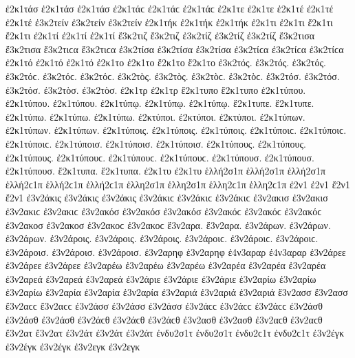 {ἐ2κ1τάσ ἐ2κ1τάσ ἐ2κ1τάσ ἐ2κ1τάϲ ἐ2κ1τάϲ ἐ2κ1τάϲ   %
ἐ2κ1τε ἐ2κ1τε 
ἐ2κ1τέ ἐ2κ1τέ ἐ2κ1τέ 
ἐ3κ2τείν ἐ3κ2τείν ἐ3κ2τείν   %
ἐ2κ1τήκ ἐ2κ1τήκ ἐ2κ1τήκ   %
ἐ2κ1τι ἐ2κ1τι 
ἔ2κ1τι ἔ2κ1τι 
ἐ2κ1τί ἐ2κ1τί ἐ2κ1τί 
ἔ3κ2τιζ ἔ3κ2τιζ   %
ἐ3κ2τίζ ἐ3κ2τίζ ἐ3κ2τίζ 
ἔ3κ2τισα ἔ3κ2τισα ἔ3κ2τιϲα ἔ3κ2τιϲα   %
ἐ3κ2τίσα ἐ3κ2τίσα ἐ3κ2τίσα ἐ3κ2τίϲα ἐ3κ2τίϲα ἐ3κ2τίϲα 
ἐ2κ1τό ἐ2κ1τό ἐ2κ1τό 
ἐ2κ1το ἐ2κ1το 
ἔ2κ1το ἔ2κ1το 
ἐ3κ2τός. ἐ3κ2τός. ἐ3κ2τός. ἐ3κ2τόϲ. ἐ3κ2τόϲ. ἐ3κ2τόϲ.   %
ἐ3κ2τὸς. ἐ3κ2τὸς. ἐ3κ2τὸϲ. ἐ3κ2τὸϲ. 
ἐ3κ2τόσ. ἐ3κ2τόσ. ἐ3κ2τόσ. 
ἐ3κ2τὸσ. ἐ3κ2τὸσ. 
ἐ2κ1τρ ἐ2κ1τρ 
ἔ2κ1τυπο ἔ2κ1τυπο   %
ἐ2κ1τύπου. ἐ2κ1τύπου. ἐ2κ1τύπου. 
ἐ2κ1τύπῳ. ἐ2κ1τύπῳ. ἐ2κ1τύπῳ. 
ἔ2κ1τυπε. ἔ2κ1τυπε. 
ἐ2κ1τύπω. ἐ2κ1τύπω. ἐ2κ1τύπω. 
ἐ2κτύποι. ἐ2κτύποι. ἐ2κτύποι. 
ἐ2κ1τύπων. ἐ2κ1τύπων. ἐ2κ1τύπων. 
ἐ2κ1τύποις. ἐ2κ1τύποις. ἐ2κ1τύποις. ἐ2κ1τύποιϲ. ἐ2κ1τύποιϲ. ἐ2κ1τύποιϲ. 
ἐ2κ1τύποισ. ἐ2κ1τύποισ. ἐ2κ1τύποισ. 
ἐ2κ1τύπους. ἐ2κ1τύπους. ἐ2κ1τύπους. ἐ2κ1τύπουϲ. ἐ2κ1τύπουϲ. ἐ2κ1τύπουϲ. 
ἐ2κ1τύπουσ. ἐ2κ1τύπουσ. ἐ2κ1τύπουσ. 
ἔ2κ1τυπα. ἔ2κ1τυπα. 
ἐ2κ1τυ ἐ2κ1τυ 
ἑλλή2σ1π ἑλλή2σ1π ἑλλή2σ1π ἑλλή2ϲ1π ἑλλή2ϲ1π ἑλλή2ϲ1π   %
ἑλλη2σ1π ἑλλη2σ1π ἑλλη2ϲ1π ἑλλη2ϲ1π 
ἐ2ν1 ἐ2ν1 
ἔ2ν1 ἔ2ν1 
ἐ3ν2άκις ἐ3ν2άκις ἐ3ν2άκις ἐ3ν2άκιϲ ἐ3ν2άκιϲ ἐ3ν2άκιϲ   %
ἐ3ν2ακισ ἐ3ν2ακισ ἐ3ν2ακιϲ ἐ3ν2ακιϲ   %
ἐ3ν2ακόσ ἐ3ν2ακόσ ἐ3ν2ακόσ ἐ3ν2ακόϲ ἐ3ν2ακόϲ ἐ3ν2ακόϲ   %
ἐ3ν2ακοσ ἐ3ν2ακοσ ἐ3ν2ακοϲ ἐ3ν2ακοϲ 
ἔ3ν2αρα. ἔ3ν2αρα.   %
ἐ3ν2άρων. ἐ3ν2άρων. ἐ3ν2άρων. 
ἐ3ν2άροις. ἐ3ν2άροις. ἐ3ν2άροις. ἐ3ν2άροιϲ. ἐ3ν2άροιϲ. ἐ3ν2άροιϲ. 
ἐ3ν2άροισ. ἐ3ν2άροισ. ἐ3ν2άροισ. 
ἐ3ν2αρηφ ἐ3ν2αρηφ   %
ἐ4ν3αραρ ἐ4ν3αραρ   %
ἐ3ν2άρεε ἐ3ν2άρεε ἐ3ν2άρεε   %
ἐ3ν2αρέω ἐ3ν2αρέω ἐ3ν2αρέω 
ἐ3ν2αρέα ἐ3ν2αρέα ἐ3ν2αρέα   %
ἐ3ν2αρεά ἐ3ν2αρεά ἐ3ν2αρεά 
ἐ3ν2άριε ἐ3ν2άριε ἐ3ν2άριε   %
ἐ3ν2αρίω ἐ3ν2αρίω ἐ3ν2αρίω 
ἐ3ν2αρία ἐ3ν2αρία ἐ3ν2αρία   %
ἐ3ν2αριά ἐ3ν2αριά ἐ3ν2αριά 
ἔ3ν2ασσ ἔ3ν2ασσ ἔ3ν2αϲϲ ἔ3ν2αϲϲ   %
ἐ3ν2άσσ ἐ3ν2άσσ ἐ3ν2άσσ ἐ3ν2άϲϲ ἐ3ν2άϲϲ ἐ3ν2άϲϲ 
ἐ3ν2άσθ ἐ3ν2άσθ ἐ3ν2άσθ ἐ3ν2άϲθ ἐ3ν2άϲθ ἐ3ν2άϲθ 
ἐ3ν2ασθ ἐ3ν2ασθ ἐ3ν2αϲθ ἐ3ν2αϲθ 
ἔ3ν2ατ ἔ3ν2ατ   %
ἐ3ν2άτ ἐ3ν2άτ ἐ3ν2άτ 
ἐνδυ2σ1τ ἐνδυ2σ1τ ἐνδυ2ϲ1τ ἐνδυ2ϲ1τ   %
ἐ3ν2έγκ ἐ3ν2έγκ ἐ3ν2έγκ   %
ἐ3ν2εγκ ἐ3ν2εγκ   %
}

